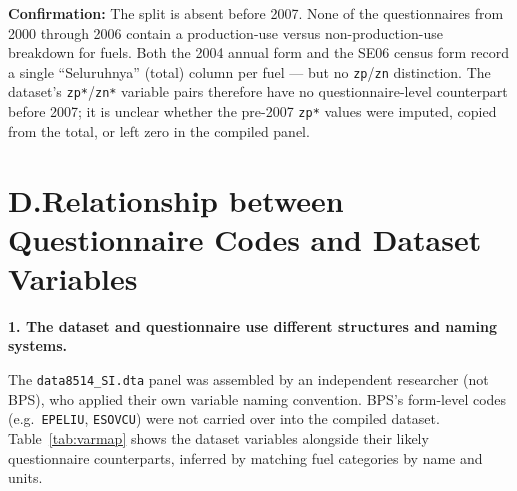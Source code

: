 \documentclass[11pt, a4paper]{article}
\begin{document}
\noindent\textbf{Confirmation:} The split is absent before 2007.
None of the questionnaires from 2000 through 2006 contain a production-use versus
non-production-use breakdown for fuels. Both the 2004 annual form and the SE06 census form
record a single ``Seluruhnya'' (total) column per fuel ---
but no \texttt{zp}/\texttt{zn} distinction.
The dataset's \texttt{zp*}/\texttt{zn*} variable pairs therefore have no questionnaire-level
counterpart before 2007; it is unclear whether the pre-2007 \texttt{zp*} values were
imputed, copied from the total, or left zero in the compiled panel.

\section{D.\;Relationship between Questionnaire Codes and Dataset Variables}
\label{sec:codemap}

\noindent\textbf{1. The dataset and questionnaire use different structures and naming systems.}

The \texttt{data8514\_SI.dta} panel was assembled by an independent researcher (not BPS),
who applied their own variable naming convention. BPS's form-level codes
(e.g.\ \texttt{EPELIU}, \texttt{ESOVCU}) were not carried over into the compiled dataset.
Table~\ref{tab:varmap} shows the dataset variables alongside their likely questionnaire
counterparts, inferred by matching fuel categories by name and units.
\end{document}
